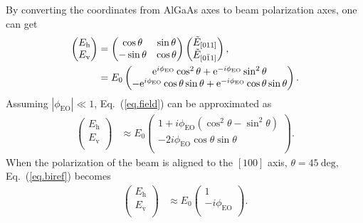 \documentclass[%
 reprint,
 superscriptaddress,
 amsmath,amssymb,
 aps,
]{revtex4-2}
\newcommand{\unit}[1]{\ \mathrm{#1}}
\begin{document}
By converting the coordinates from AlGaAs axes to beam polarization axes, one can get
\begin{align}
    \begin{pmatrix}
    E_{\mathrm{h}} \\ E_{\mathrm{v}} \\
    \end{pmatrix}
    &=
    \begin{pmatrix}
    \cos\theta & \sin\theta  \\ -\sin\theta & \cos\theta \\
    \end{pmatrix}
    \begin{pmatrix}
    \tilde{E}_{[011]} \\ \tilde{E}_{[0\bar{1}1]} \\
    \end{pmatrix}, \notag \\
    &= E_0
    \begin{pmatrix}
    \mathrm{e}^{i\phi_{\mathrm{EO}}}\cos^2\theta + \mathrm{e}^{-i\phi_{\mathrm{EO}}}\sin^2\theta \\
    -\mathrm{e}^{i\phi_{\mathrm{EO}}}\cos\theta\sin\theta + \mathrm{e}^{-i\phi_{\mathrm{EO}}}\cos\theta\sin\theta \\
    \end{pmatrix}.
    \label{eq.field}
\end{align}
Assuming $|\phi_{\mathrm{EO}}|\ll1$, Eq.~(\ref{eq.field}) can be approximated as
\begin{align}
    \begin{pmatrix}
    E_{\mathrm{h}} \\ E_{\mathrm{v}} \\
    \end{pmatrix}
    &\approx E_0
    \begin{pmatrix}
    1 + i\phi_{\mathrm{EO}}(\cos^2\theta - \sin^2\theta) \\ -2i\phi_{\mathrm{EO}}\cos\theta\sin\theta \\
    \end{pmatrix}.
    \label{eq.biref}
\end{align}
When the polarization of the beam is aligned to the $[100]$ axis, $\theta=45\unit{deg}$, Eq.~(\ref{eq.biref}) becomes
\begin{align}
    \begin{pmatrix}
    E_{\mathrm{h}} \\ E_{\mathrm{v}} \\
    \end{pmatrix}
    &\approx E_0
    \begin{pmatrix}
    1  \\ -i\phi_{\mathrm{EO}} \\
    \end{pmatrix}.
\end{align}
\end{document}
